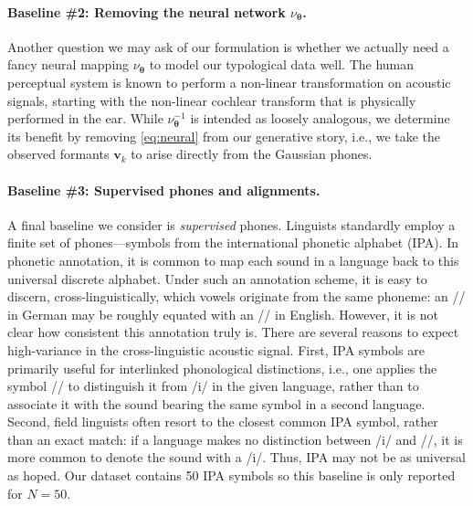 \documentclass[11pt,a4paper]{article}
\newcommand{\vtheta}{{\boldsymbol \theta}}
\newcommand{\vv}{{\mathbf{v}}}
\newcommand{\NN}{\nu_{\vtheta}}
\begin{document}
\paragraph{Baseline \#2: Removing the neural network $\NN$.}
Another question we may ask of our formulation is whether we actually
need a fancy neural mapping $\NN$ to model our typological data
well. The human perceptual system is known to perform a non-linear
transformation on acoustic signals, starting with the non-linear
cochlear transform that is physically performed in the ear.
While $\NN^{-1}$ is intended as loosely analogous, we determine
its benefit by removing \cref{eq:neural} from our generative story, i.e.,
we take the observed formants $\vv_k$ to arise directly from the
Gaussian phones.

\paragraph{Baseline \#3: Supervised phones and alignments.}
A final baseline we consider is {\em supervised} phones.  Linguists
standardly employ a finite set of phones---symbols from the
international phonetic alphabet (IPA). In phonetic annotation, it
is common to map each sound in a language back to this universal
discrete alphabet. Under such an annotation scheme, it is easy to
discern, cross-linguistically, which vowels originate from the same
phoneme: an // in German may be roughly equated with an
// in English. However, it is not clear how consistent this
annotation truly is. There are several reasons to expect high-variance
in the cross-linguistic acoustic signal. First, IPA symbols are
primarily useful for interlinked phonological distinctions, i.e., one
applies the symbol // to distinguish it from /i/ in the
given language, rather than to associate it with the sound bearing the
same symbol in a second language. Second, field linguists often resort
to the closest common IPA symbol, rather than an exact match: if a
language makes no distinction between /i/ and //, it is
more common to denote the sound with a /i/. Thus, IPA may not be as
universal as hoped. Our dataset contains 50 IPA symbols so this
baseline is only reported for $N=50$.
\end{document}
